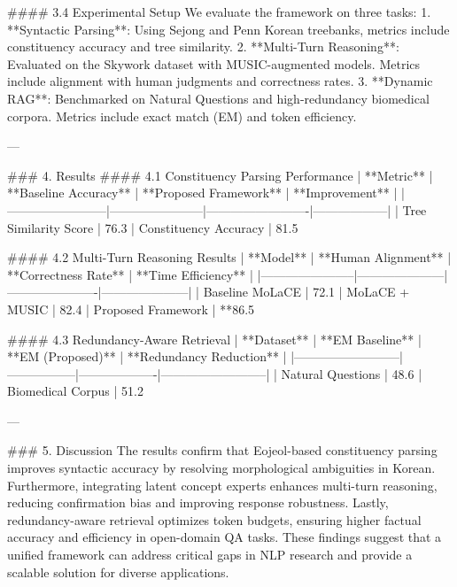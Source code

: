 #### 3.4 Experimental Setup  
We evaluate the framework on three tasks:  
1. **Syntactic Parsing**: Using Sejong and Penn Korean treebanks, metrics include constituency accuracy and tree similarity.  
2. **Multi-Turn Reasoning**: Evaluated on the Skywork dataset with MUSIC-augmented models. Metrics include alignment with human judgments and correctness rates.  
3. **Dynamic RAG**: Benchmarked on Natural Questions and high-redundancy biomedical corpora. Metrics include exact match (EM) and token efficiency.

---

### 4. Results  
#### 4.1 Constituency Parsing Performance  
| **Metric**            | **Baseline Accuracy** | **Proposed Framework** | **Improvement** |
|------------------------|-----------------------|-------------------------|------------------|
| Tree Similarity Score  | 76.3%
| Constituency Accuracy  | 81.5%

#### 4.2 Multi-Turn Reasoning Results  
| **Model**             | **Human Alignment** | **Correctness Rate** | **Time Efficiency** |
|-----------------------|---------------------|----------------------|---------------------|
| Baseline MoLaCE       | 72.1%
| MoLaCE + MUSIC        | 82.4%
| Proposed Framework    | **86.5%

#### 4.3 Redundancy-Aware Retrieval  
| **Dataset**              | **EM Baseline** | **EM (Proposed)** | **Redundancy Reduction** |
|--------------------------|-----------------|-------------------|--------------------------|
| Natural Questions        | 48.6%
| Biomedical Corpus        | 51.2%

---

### 5. Discussion  
The results confirm that Eojeol-based constituency parsing improves syntactic accuracy by resolving morphological ambiguities in Korean. Furthermore, integrating latent concept experts enhances multi-turn reasoning, reducing confirmation bias and improving response robustness. Lastly, redundancy-aware retrieval optimizes token budgets, ensuring higher factual accuracy and efficiency in open-domain QA tasks. These findings suggest that a unified framework can address critical gaps in NLP research and provide a scalable solution for diverse applications.

